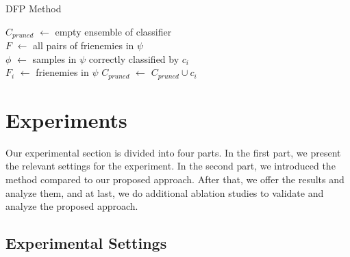 \documentclass[review]{elsarticle}
\begin{document}
\begin{algorithm}[H]
	\SetAlgoNoLine
	\caption{DFP Method}
	$C_{pruned}$ $\leftarrow$ empty ensemble of classifier\\
	$F$ $\leftarrow$ all pairs of frienemies in $\psi$\\
	{
		$\phi$ $\leftarrow$ samples in $\psi$ correctly classified by $c_i$ \\
		$F_i$ $\leftarrow$ frienemies in $\psi$
		{
			$C_{pruned}$ $\leftarrow$ $C_{pruned} \cup c_i$
		}
	}
\end{algorithm}

\section{Experiments}

Our experimental section is divided into four parts. In the first part, we present the relevant settings for the experiment. In the second part, we introduced the method compared to our proposed approach. After that, we offer the results and analyze them, and at last, we do additional ablation studies to validate and analyze the proposed approach.
\subsection{Experimental Settings}
\end{document}
